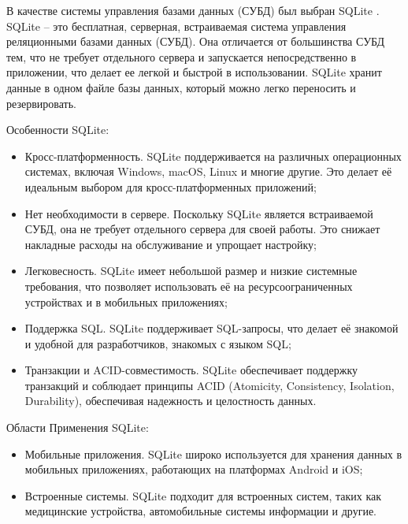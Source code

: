 В качестве системы управления базами данных (СУБД) был выбран SQLite \cite{sqllite}. SQLite -- это бесплатная, серверная, встраиваемая система управления реляционными базами данных (СУБД). Она отличается от большинства СУБД тем, что не требует отдельного сервера и запускается непосредственно в приложении, что делает ее легкой и быстрой в использовании. SQLite хранит данные в одном файле базы данных, который можно легко переносить и резервировать.  

Особенности SQLite:
\begin{itemize}
\item Кросс-платформенность. SQLite поддерживается на различных операционных системах, включая Windows, macOS, Linux и многие другие. Это делает её идеальным выбором для кросс-платформенных приложений;
\item Нет необходимости в сервере. Поскольку SQLite является встраиваемой СУБД, она не требует отдельного сервера для своей работы. Это снижает накладные расходы на обслуживание и упрощает настройку;
\item Легковесность. SQLite имеет небольшой размер и низкие системные требования, что позволяет использовать её на ресурсоограниченных устройствах и в мобильных приложениях;
\item Поддержка SQL. SQLite поддерживает SQL-запросы, что делает её знакомой и удобной для разработчиков, знакомых с языком SQL;
\item Транзакции и ACID-совместимость. SQLite обеспечивает поддержку транзакций и соблюдает принципы ACID (Atomicity, Consistency, Isolation, Durability), обеспечивая надежность и целостность данных.
\end{itemize}

Области Применения SQLite:
\begin{itemize}
\item Мобильные приложения. SQLite широко используется для хранения данных в мобильных приложениях, работающих на платформах Android и iOS;
\item Встроенные системы. SQLite подходит для встроенных систем, таких как медицинские устройства, автомобильные системы информации и другие.
\end{itemize}


